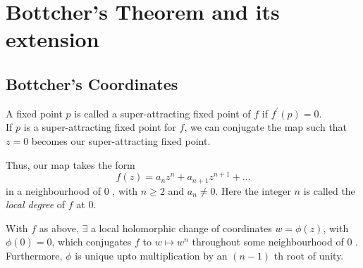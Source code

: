 \chapter{Bottcher's Theorem and its extension}
\section{Bottcher's Coordinates}
A fixed point $p$ is called a super-attracting fixed point of $f$ if $f^{\prime}\left(p\right)=0$.\\
If $p$ is a super-attracting fixed point for $f$, we can conjugate the map such that $z=0$ becomes our super-attracting fixed point.

Thus, our map takes the form $$f(z)=a_{n} z^{n}+a_{n+1} z^{n+1}+\ldots$$ in a neighbourhood of 0 , with $n \geq 2$ and $a_{n} \neq 0$. Here the integer $n$ is called the \emph{local degree} of \( f \) at \( 0 \).

\begin{theorem}
	With $f$ as above, $\exists$ a local holomorphic change of coordinates $w=\phi(z)$, with $\phi(0)=0$, which conjugates $f$ to $w \mapsto w^{n}$ throughout some neighbourhood of 0 .\\
Furthermore, $\phi$ is unique upto multiplication by an $(n-1)$ th root of unity.
\end{theorem}

